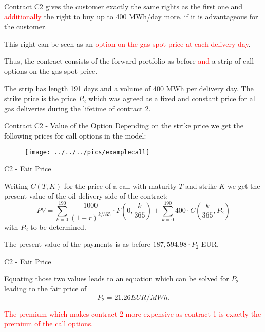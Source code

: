 	Contract C2 gives the customer exactly the same rights as the first one and \textcolor{red}{additionally} the right to buy up to 400 MWh/day more, if it is advantageous for the customer.

	This right can be seen as an \textcolor{red}{option on the gas spot price at each delivery day}.

	Thus, the contract consists of the forward portfolio as before \textcolor{red}{and} a strip of call options on the gas spot price.

	The strip has length 191 days and a volume of 400 MWh per delivery day. The strike price is the price $P_2$ which was agreed as a fixed and constant price for all gas deliveries during the lifetime of contract 2.






{Contract C2 - Value of the Option}
Depending on the strike price we get the following prices for call options in the model:
\begin{figure}
	\centering
		\texttt{[image: ../../../pics/examplecall]}
	\label{fig:examplecall}
\end{figure}

{C2 - Fair Price}






Writing $C(T,K)$ for the price of a call with maturity $T$ and strike $K$ we get the present value of the oil delivery side of the contract:
$$
	PV = \sum_{k=0}^{190} \frac{1000}{(1+r)^{k/365}} \cdot F(0,\frac k {365}) + \sum_{k=0}^{190} 400 \cdot C(\frac k {365},P_2)
$$
with $P_2$ to be determined.

	The present value of the payments is as before $187,594.98 \cdot P_2$ EUR.






{C2 - Fair Price}






Equating those two values leads to an equation which can be solved for $P_2$ leading to the fair price of
$$
	P_2 = 21.26 EUR/MWh.
$$

\textcolor{red}{The premium which makes contract 2 more expensive as contract 1 is exactly the premium of the call options.}



